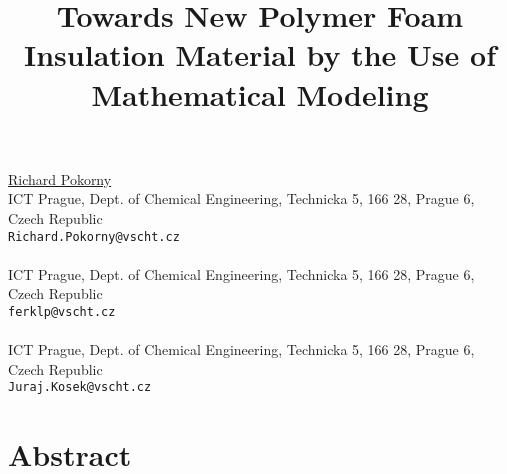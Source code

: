 \title{Towards New Polymer Foam Insulation Material by the Use of Mathematical Modeling}
 \author{} \institute{}
\maketitle
\begin{center}
{\large \underline{Richard Pokorny}}\\
ICT Prague, Dept. of Chemical Engineering, Technicka 5, 166 28, Prague 6, Czech Republic\\
{\tt Richard.Pokorny@vscht.cz}
\\ \vspace{4mm}{\large Pavel Ferkl}\\
ICT Prague, Dept. of Chemical Engineering, Technicka 5, 166 28, Prague 6, Czech Republic\\
{\tt ferklp@vscht.cz}
\\ \vspace{4mm}{\large Kosek Juraj}\\
ICT Prague, Dept. of Chemical Engineering, Technicka 5, 166 28, Prague 6, Czech Republic\\
{\tt Juraj.Kosek@vscht.cz}

\end{center}

\section*{Abstract}

